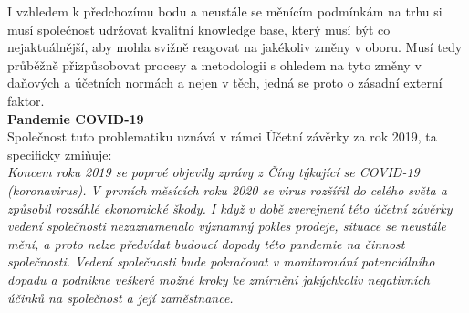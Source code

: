 I vzhledem k předchozímu bodu a neustále se měnícím podmínkám na trhu si musí společnost udržovat kvalitní knowledge base, který musí být co nejaktuálnější, aby mohla svižně reagovat na jakékoliv změny v oboru. Musí tedy průběžně přizpůsobovat procesy a metodologii s ohledem na tyto změny v daňových a účetních normách a nejen v těch, jedná se proto o zásadní externí faktor.\\





%




 
\textbf{Pandemie COVID-19}\\

Společnost tuto problematiku uznává v rámci Účetní závěrky za rok 2019, ta specificky zmiňuje:\\

\textit{Koncem roku 2019 se poprvé objevily zprávy z Číny týkající se COVID-19 (koronavirus). V prvních měsících roku 2020 se virus rozšířil do celého světa a způsobil rozsáhlé ekonomické škody. I když v době zverejnení této účetní závěrky vedení společnosti nezaznamenalo významný pokles prodeje, situace se neustále mění, a proto nelze předvídat budoucí dopady této pandemie na činnost společnosti. Vedení společnosti bude pokračovat v monitorování potenciálního dopadu a podnikne veškeré možné kroky ke zmírnění jakýchkoliv negativních účinků na společnost a její zaměstnance.}

